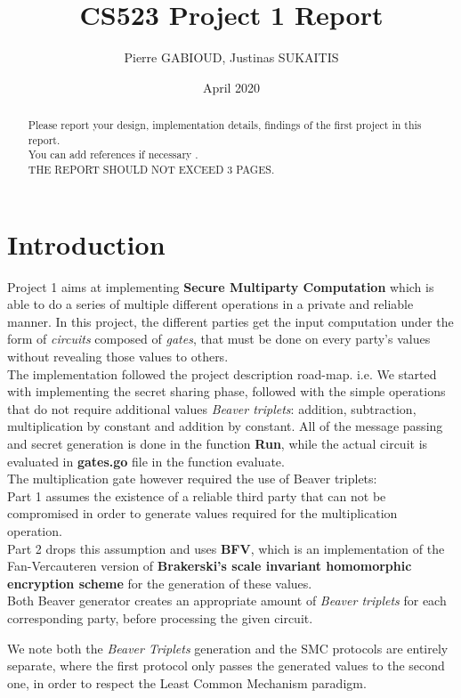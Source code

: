 \documentclass[10pt,conference,compsocconf]{IEEEtran}
\title{CS523 Project 1 Report}
\author{Pierre GABIOUD, Justinas SUKAITIS}
\date{April 2020}
\begin{document}
\maketitle

\begin{abstract}
    Please report your design, implementation details, findings of the first project in this report. \\
    You can add references if necessary \cite{article}. \\
    THE REPORT SHOULD NOT EXCEED 3 PAGES.
\end{abstract}
\section{Introduction}
Project 1 aims at implementing \textbf{Secure Multiparty Computation} which is able to do a series of multiple different operations in a private and reliable manner. 
In this project, the different parties get the input computation under the form of \textit{circuits} composed of \textit{gates}, that must be done on every party's values without revealing those values to others. \\

The implementation followed the project description road-map. i.e. We started with implementing the secret sharing phase, followed with the simple operations that do not require additional values \textit{Beaver triplets}: addition, subtraction, multiplication by constant and addition by constant. All of the message passing and secret generation is done in the function \textbf{Run}, while the actual circuit is evaluated in \textbf{gates.go} file in the function evaluate. \\
The multiplication gate however required the use of Beaver triplets: \\
Part 1 assumes the existence of a reliable third party that can not be compromised in order to generate values required for the multiplication operation. \\
Part 2 drops this assumption and uses \textbf{BFV}, which is an implementation of the Fan-Vercauteren version of \textbf{Brakerski's scale invariant homomorphic encryption scheme} for the generation of these values. \\
Both Beaver generator creates an appropriate amount of \textit{Beaver triplets} for each corresponding party, before processing the given circuit.

We note both the \textit{Beaver Triplets} generation and the SMC protocols are entirely separate, where the first protocol only passes the generated values to the second one, in order to respect the Least Common Mechanism paradigm.
\end{document}
